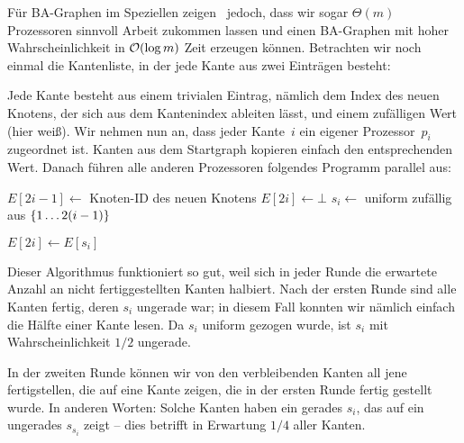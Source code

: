 Für BA-Graphen im Speziellen zeigen~\cite{SANDERS2016489} jedoch, dass wir sogar $\Theta(m)$ Prozessoren sinnvoll Arbeit zukommen lassen und einen BA-Graphen mit hoher Wahrscheinlichkeit in $\mathcal{O}\!\left(\log m\right)$ Zeit erzeugen können.
Betrachten wir noch einmal die  Kantenliste, in der jede Kante aus zwei Einträgen besteht:

\begin{center}
\end{center}

Jede Kante besteht aus einem trivialen  Eintrag, nämlich dem Index des neuen Knotens, der sich aus dem Kantenindex ableiten lässt, und einem zufälligen Wert (hier weiß).
Wir nehmen nun an, dass jeder Kante~$i$ ein eigener Prozessor~$p_i$ zugeordnet ist.
Kanten aus dem Startgraph kopieren einfach den entsprechenden Wert.
Danach führen alle anderen Prozessoren folgendes Programm parallel aus:

\smallbreak
{}
\begin{algorithm}[H]
    $E[2i - 1] \gets$ Knoten-ID des neuen Knotens\;
    $E[2i] \gets \bot$\;
    \BlankLine
    $s_i \gets $ uniform zufällig aus $\left\{1 \ldots 2(i-1)\right\}$\;

    $E[2i] \gets E[s_i]$\;
\end{algorithm}
\smallbreak

Dieser Algorithmus funktioniert so gut, weil sich in jeder Runde die erwartete Anzahl an nicht fertiggestellten Kanten halbiert.
Nach der ersten Runde sind alle Kanten fertig, deren $s_i$ ungerade war;
in diesem Fall konnten wir nämlich einfach die  Hälfte einer Kante lesen.
Da $s_i$ uniform gezogen wurde, ist $s_i$ mit Wahrscheinlichkeit $1/2$ ungerade.

In der zweiten Runde können wir von den verbleibenden Kanten all jene fertigstellen, die auf eine Kante zeigen, die in der ersten Runde fertig gestellt wurde.
In anderen Worten: Solche Kanten haben ein gerades $s_i$, das auf ein ungerades $s_{s_i}$ zeigt -- dies betrifft in Erwartung $1/4$ aller Kanten.

